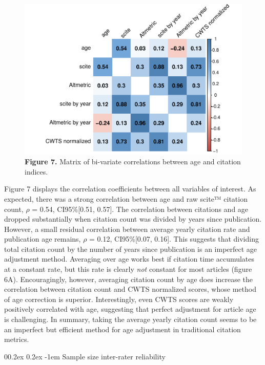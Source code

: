 \documentclass[
  man,floatsintext]{apa6}
\makeatletter
\let\oldparagraph\paragraph
\renewcommand{\paragraph}[1]{\oldparagraph{#1}\mbox{}}
\renewcommand{\paragraph}{\@startsection{paragraph}{4}{\parindent}%
  {0\baselineskip \@plus 0.2ex \@minus 0.2ex}%
  {-1em}%
  {\normalfont\normalsize\bfseries\itshape\typesectitle}}
\makeatother
\begin{document}
\begin{figure}
\centering
\includegraphics{RVcn_feasibility_in_social_neuroscience_files/figure-latex/fig7-1.pdf}
\caption{\label{fig:fig7}\textbf{Figure 7.} Matrix of bi-variate correlations between age and citation indices.}
\end{figure}

Figure 7 displays the correlation coefficients between all variables of interest. As expected, there was a strong correlation between age and raw scite™ citation count, \(\rho\) = 0.54, CI95\%{[}0.51, 0.57{]}. The correlation between citations and age dropped substantially when citation count was divided by years since publication. However, a small residual correlation between average yearly citation rate and publication age remains, \(\rho\) = 0.12, CI95\%{[}0.07, 0.16{]}. This suggests that dividing total citation count by the number of years since publication is an imperfect age adjustment method. Averaging over age works best if citation time accumulates at a constant rate, but this rate is clearly \emph{not} constant for most articles (figure 6A). Encouragingly, however, averaging citation count by age does increase the correlation between citation count and CWTS normalized scores, whose method of age correction is superior. Interestingly, even CWTS scores are weakly positively correlated with age, suggesting that perfect adjustment for article age is challenging. In summary, taking the average yearly citation count seems to be an imperfect but efficient method for age adjustment in traditional citation metrics.

\hypertarget{sample-size-inter-rater-reliability}{%
\paragraph{Sample size inter-rater reliability}\label{sample-size-inter-rater-reliability}}
\end{document}
